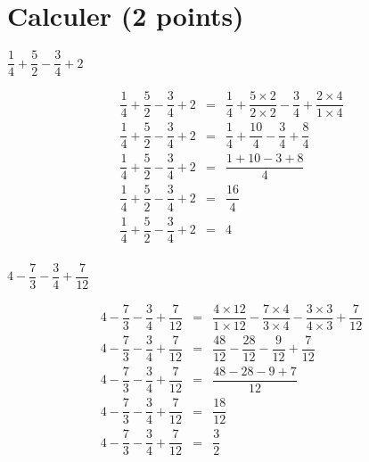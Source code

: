 \section{Calculer (2 points)}


\begin{questions}
	\question[1] $\dfrac{1}{4} + \dfrac{5}{2} - \dfrac{3}{4} + 2$
	\begin{solution}
		\begin{eqnarray*}
			\dfrac{1}{4} + \dfrac{5}{2} - \dfrac{3}{4} + 2 &=& \dfrac{1}{4} + \dfrac{5\times 2}{2 \times 2} - \dfrac{3}{4} + \dfrac{2 \times 4}{1 \times 4} \\
			\dfrac{1}{4} + \dfrac{5}{2} - \dfrac{3}{4} + 2 &=& \dfrac{1}{4} + \dfrac{10}{4} - \dfrac{3}{4} + \dfrac{8}{4} \\
			\dfrac{1}{4} + \dfrac{5}{2} - \dfrac{3}{4} + 2 &=& \dfrac{1 + 10 - 3 + 8}{4} \\
			\dfrac{1}{4} + \dfrac{5}{2} - \dfrac{3}{4} + 2 &=& \dfrac{16}{4} \\
			\dfrac{1}{4} + \dfrac{5}{2} - \dfrac{3}{4} + 2 &=& 4 \\
		\end{eqnarray*}
	\end{solution}
	
	\question[1] $4 - \dfrac{7}{3} - \dfrac{3}{4} + \dfrac{7}{12}$
	\begin{solution}
		\begin{eqnarray*}
			4 - \dfrac{7}{3} - \dfrac{3}{4} + \dfrac{7}{12} &=& \dfrac{4 \times 12}{1 \times 12} - \dfrac{7\times 4}{3 \times 4} - \dfrac{3 \times 3}{4 \times 3} + \dfrac{7}{12} \\
			4 - \dfrac{7}{3} - \dfrac{3}{4} + \dfrac{7}{12} &=& \dfrac{48}{12} - \dfrac{28}{12} - \dfrac{9}{12} + \dfrac{7}{12} \\
			4 - \dfrac{7}{3} - \dfrac{3}{4} + \dfrac{7}{12} &=& \dfrac{48 - 28 - 9 + 7}{12} \\
			4 - \dfrac{7}{3} - \dfrac{3}{4} + \dfrac{7}{12} &=& \dfrac{18}{12} \\
			4 - \dfrac{7}{3} - \dfrac{3}{4} + \dfrac{7}{12} &=& \dfrac{3}{2} \\
		\end{eqnarray*}
	\end{solution}
\end{questions}
